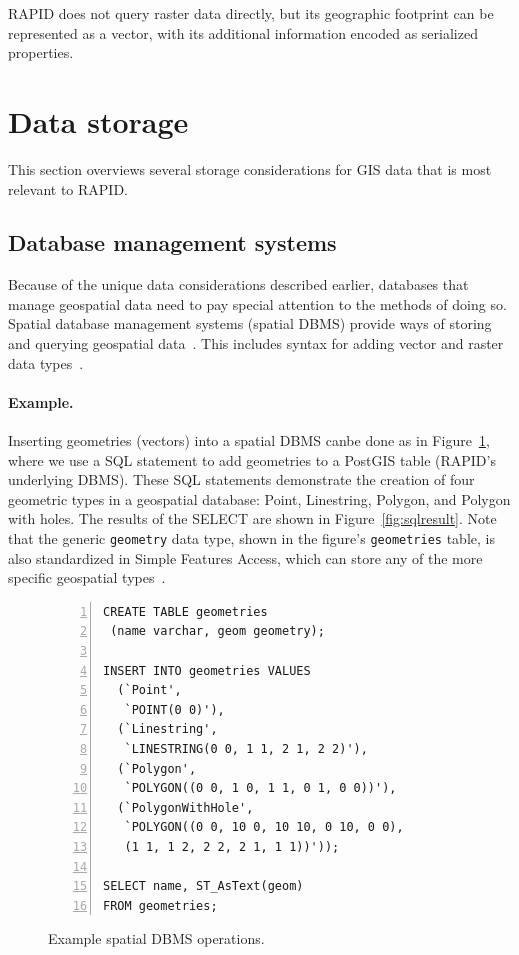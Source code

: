 RAPID does not query raster data directly, but its geographic footprint can be represented as a vector, with its additional information encoded as serialized properties.

\section{Data storage}
\label{storage}
This section overviews several storage considerations for GIS data that is most relevant to RAPID.

\subsection{Database management systems}
Because of the unique data considerations described earlier, databases that manage geospatial data need to pay special attention to the methods of doing so. Spatial database management systems (spatial DBMS) provide ways of storing and querying geospatial data~\cite{Boundless}. This includes syntax for adding vector and raster data types~\cite{Boundless}.

\paragraph{Example.}
\label{background_wkt}
Inserting geometries (vectors) into a spatial DBMS canbe done as in Figure~\ref{fig:spatialsql}, where we use a SQL statement to add geometries to a PostGIS table (RAPID's underlying DBMS). These SQL statements demonstrate the creation of four geometric types in a geospatial database: Point, Linestring, Polygon, and Polygon with holes. The results of the SELECT are shown in Figure~\ref{fig:sqlresult}. Note that the generic \texttt{geometry} data type, shown in the figure's \texttt{geometries} table, is also standardized in Simple Features Access, which can store any of the more specific geospatial types~\cite{Boundless,SFA}.

\begin{figure}
\begin{Verbatim}[samepage=true,baselinestretch=1,numbers=left,xleftmargin=12mm]
CREATE TABLE geometries
 (name varchar, geom geometry);

INSERT INTO geometries VALUES
  (`Point',
   `POINT(0 0)'),
  (`Linestring',
   `LINESTRING(0 0, 1 1, 2 1, 2 2)'),
  (`Polygon',
   `POLYGON((0 0, 1 0, 1 1, 0 1, 0 0))'),
  (`PolygonWithHole',
   `POLYGON((0 0, 10 0, 10 10, 0 10, 0 0),
   (1 1, 1 2, 2 2, 2 1, 1 1))'));

SELECT name, ST_AsText(geom)
FROM geometries;
\end{Verbatim}
\vspace{-22pt}
\caption{Example spatial DBMS operations.}
\vspace{8pt}
\label{fig:spatialsql}
\end{figure}


